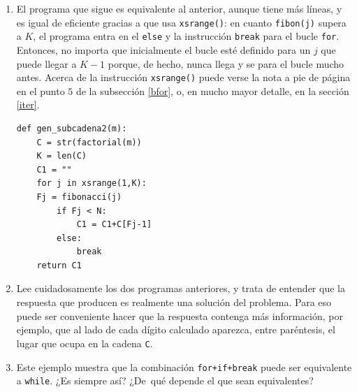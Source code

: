 \begin{enumerate}
\begin{enumerate}
\begin{lstlisting}[linewidth=.86\textwidth]
def gen_subcadena(m):
    C = str(factorial(m))   #Convertimos el factorial de m en una cadena
    K = len(C)
    C1 = ""  #Contendr$\X a$ la soluci$\X o$n
    j = 1
    while  fibonacci(j) < K:
        C1 = C1+C[fibonacci(j)-1] #A$\X n$adimos a C1 un d$\X i$gito cuya
posici$\X o$n es un n$\X u$mero de Fibonacci
        j += 1  #Incrementamos j para que el bucle NO sea infinito
    return C1
\end{lstlisting}


Usar un \lstinline|while| es  muy conveniente porque no sabemos {\itshape a
priori} 
cuál va a ser el primer número en la sucesión de Fibonacci que supere
$K$. Podr\'{\i}amos intentar resolver primero el problema (matem\'atico)
consistente en calcular, dado un entero $K$, el mayor n\'umero de Fibonacci
menor que $K$. 

\item El programa que sigue es {\sc equivalente} al anterior, aunque tiene más
líneas, y es igual de eficiente gracias a que usa \lstinline|xsrange()|: en
cuanto \lstinline|fibon(j)| supera a $K$, el programa entra en el
\lstinline|else| y la
instrucción \lstinline|break| para el bucle \lstinline|for|. Entonces, no
importa que
inicialmente el bucle esté definido para un $j$ que puede llegar a $K-1$
porque, de hecho, nunca llega y se para el bucle mucho antes. Acerca de la
instrucci\'on  \lstinline|xsrange()| puede verse la nota a pie de p\'agina en el
punto $5$ de la subsecci\'on \ref{bfor}, o, en mucho mayor detalle, en la
secci\'on \ref{iter}. 

\begin{lstlisting}
def gen_subcadena2(m):
    C = str(factorial(m))
    K = len(C)
    C1 = ""
    for j in xsrange(1,K):
	Fj = fibonacci(j)
        if Fj < N:
            C1 = C1+C[Fj-1]
        else:
            break
    return C1 
\end{lstlisting}


\item Lee cuidadosamente los dos programas anteriores,  y trata de entender que
la respuesta que producen es realmente una solución del problema. Para eso
puede ser conveniente hacer que la respuesta contenga más información, por
ejemplo,  que al lado de cada dígito calculado aparezca, entre
paréntesis, el lugar que ocupa en la cadena \lstinline|C|.






\item Este ejemplo muestra que la combinaci\'on \lstinline|for+if+break| puede
ser equivalente a
\lstinline|while|. ¿Es siempre así? ¿De~qué \linebreak[2] \mbox{depende} el que
sean equivalentes?


\end{enumerate}
\end{enumerate}
